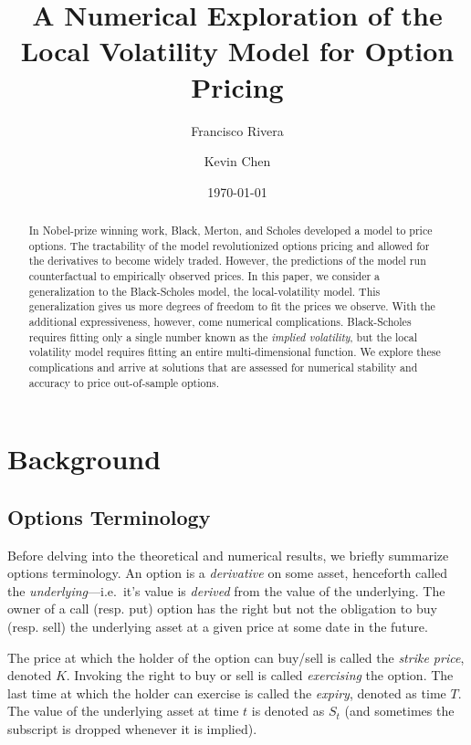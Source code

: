 \documentclass[12pt]{article}
\numberwithin{equation}{section}
\begin{document}
\onecolumn

\title{A Numerical Exploration of the Local Volatility Model for Option Pricing}
\author{Francisco Rivera \and Kevin Chen}
\date{\today}

\maketitle

\begin{abstract}
In Nobel-prize winning work, Black, Merton, and Scholes developed a model to
price options. The tractability of the model revolutionized options pricing and
allowed for the derivatives to become widely traded. However, the
predictions of the model run counterfactual to empirically observed prices. In
this paper, we consider a generalization to the Black-Scholes model, the
local-volatility model. This generalization gives us more degrees of freedom to
fit the prices we observe. With the additional expressiveness, however, come
numerical complications. Black-Scholes requires fitting only a single number
known as the \emph{implied volatility}, but the local volatility model requires
fitting an entire multi-dimensional function. We explore these complications and
arrive at solutions that are assessed for numerical stability and accuracy to
price out-of-sample options.
\end{abstract}

\tableofcontents

\newpage

\section{Background}
\label{sec:background}

\subsection{Options Terminology}
\label{subsec:terminology}

Before delving into the theoretical and numerical results, we briefly summarize
options terminology. An option is a \emph{derivative} on some asset, henceforth called
the \emph{underlying}---i.e.\ it's value is \emph{derived} from the value of the
underlying. The owner of a call (resp. put) option has the right but not the obligation
to buy (resp. sell) the underlying asset at a given price at some date in the future.

The price at which the holder of the option can buy/sell is called the
\emph{strike price}, denoted $K$. Invoking the right to buy or sell is called
\emph{exercising} the option. The last time at which the holder can exercise is
called the \emph{expiry}, denoted as time $T$. The value of the underlying asset
at time $t$ is denoted as $S_t$ (and sometimes the subscript is dropped whenever
it is implied). 
\end{document}
